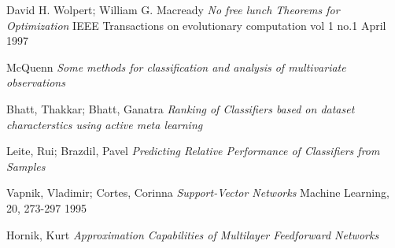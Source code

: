 \documentclass[a4paper,11pt]{article}
\begin{document}
\begin{thebibliography}{9}
  David H. Wolpert; William G. Macready
  \textit{No free lunch Theorems for Optimization}
  IEEE Transactions on evolutionary computation vol 1 no.1 April 1997

  McQuenn
  \textit{Some methods for classification and analysis of multivariate observations}

  Bhatt, Thakkar; Bhatt, Ganatra
  \textit{Ranking of Classifiers based on dataset characterstics using active meta learning}

  Leite, Rui; Brazdil, Pavel
  \textit{Predicting Relative Performance of Classifiers from Samples}

  Vapnik, Vladimir; Cortes, Corinna
  \textit{Support-Vector Networks}
  Machine Learning, 20, 273-297 1995

  Hornik, Kurt
  \textit{Approximation Capabilities of Multilayer Feedforward Networks}

\end{thebibliography}
\end{document}
